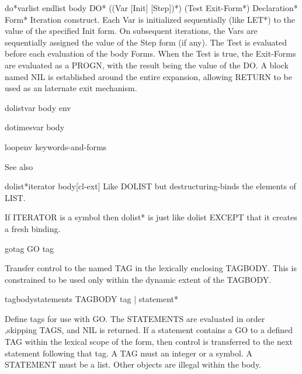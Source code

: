 \documentclass[10pt,english]{book}
\begin{document}
\begin{macro}{do*}{varlist endlist \body body}
  DO* ({(Var [Init] [Step])}*) (Test Exit-Form*) Declaration* Form*
  Iteration construct. Each Var is initialized sequentially (like LET*) to the
  value of the specified Init form. On subsequent iterations, the Vars are
  sequentially assigned the value of the Step form (if any). The Test is
  evaluated before each evaluation of the body Forms. When the Test is true,
  the Exit-Forms are evaluated as a PROGN, with the result being the value
  of the DO. A block named NIL is established around the entire expansion,
  allowing RETURN to be used as an laternate exit mechanism.
\end{macro}

\begin{macro}{dolist}{var \body body \env env}
  
\end{macro}

\begin{macro}{dotimes}{var \body body}
  
\end{macro}

\begin{macro}{loop}{\env env \rest keywords-and-forms}
  
\end{macro}

See also 

\begin{macro}{dolist*}{iterator \body body}[cl-ext]
  Like DOLIST but destructuring-binds the elements of LIST.

If ITERATOR is a symbol then dolist* is just like dolist EXCEPT
that it creates a fresh binding.
\end{macro}

\begin{specialop}{go}{tag}
  GO tag

Transfer control to the named TAG in the lexically enclosing TAGBODY. This is
constrained to be used only within the dynamic extent of the TAGBODY.
\end{specialop}

\begin{specialop}{tagbody}{\rest statements}
  TAGBODY {tag | statement}*

Define tags for use with GO. The STATEMENTS are evaluated in order ,skipping
TAGS, and NIL is returned. If a statement contains a GO to a defined TAG
within the lexical scope of the form, then control is transferred to the next
statement following that tag. A TAG must an integer or a symbol. A STATEMENT
must be a list. Other objects are illegal within the body.
\end{specialop}
\end{document}
